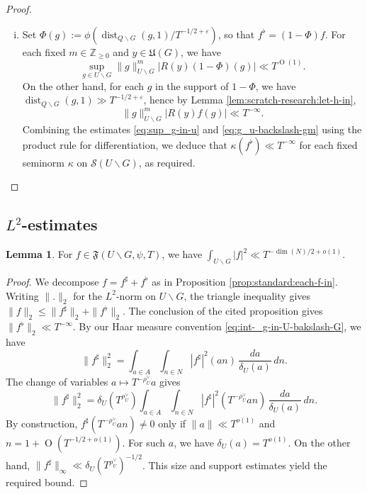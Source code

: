 \documentclass[reqno]{amsart}
\def\eps{\varepsilon}
\DeclareMathOperator{\dist}{dist}
\def\O{\operatorname{O}}
\theoremstyle{plain} \newtheorem{theorem} {Theorem}
\theoremstyle{definition} \newtheorem{definition} [theorem] {Definition}
\theoremstyle{itplain} %
\newtheorem{lemma}[theorem]{Lemma}
\numberwithin{equation}{section}
\numberwithin{theorem}{section}
\renewcommand{\geq}{\geqslant}
\renewcommand{\leq}{\leqslant}
\begin{document}
\begin{proof}
\begin{enumerate}[(i)]
  \item Set $\Phi(g) := \phi \left(\dist_{Q \backslash G}(g,1) / T^{-1/2+\eps} \right)$, so that $f ^\flat = (1 - \Phi) f$.  For each fixed $m \in \mathbb{Z}_{\geq 0}$ and $y \in \mathfrak{U}(G)$, we have
    \begin{equation}\label{eq:sup_g-in-u}
      \sup_{g \in U \backslash G} \|g\|_{U \backslash G}^m \left\lvert  R(y) (1 - \Phi)(g) \right\rvert
      \ll T^{\O(1)}.
    \end{equation}
    On the other hand, for each $g$ in the support of $1 - \Phi$, we have $\dist_{Q \backslash G}(g,1) \gg T^{-1/2+\eps}$, hence by Lemma \ref{lem:scratch-research:let-h-in},
    \begin{equation}\label{eq:g_u-backslash-gm}
      \|g\|_{U \backslash G}^m \left\lvert  R(y) f (g) \right\rvert
      \ll T^{-\infty }.
    \end{equation}
    Combining the estimates \eqref{eq:sup_g-in-u} and \eqref{eq:g_u-backslash-gm} using the product rule for differentiation, we deduce that $\kappa(f ^\flat ) \ll T^{-\infty}$ for each fixed seminorm $\kappa$ on $\mathcal{S}(U \backslash G)$, as required.
  \end{enumerate}

\end{proof}

\subsection{$L^2$-estimates}

\begin{lemma}
  For $f \in \mathfrak{F}(U \backslash G, \psi, T)$, we have $\int _{U \backslash G} |f|^2 \ll T^{-\dim(N)/2 + o(1)}$.
\end{lemma}
\begin{proof}
  We decompose $f = f ^\sharp + f ^\flat$ as in Proposition \ref{prop:standard:each-f-in}.  Writing $\|.\|_2$ for the $L^2$-norm on $U \backslash G$, the triangle inequality gives $\|f\|_2 \leq \|f ^\sharp \|_2 + \|f ^\flat \|_2$.  The conclusion of the cited proposition gives $\|f ^\flat \|_2 \ll T^{-\infty}$.  By our Haar measure convention \eqref{eq:int-_g-in-U-bakslash-G}, we have
  \begin{equation*}
    \|f ^\sharp \|_2^2
    =
    \int _{a \in A}
    \int _{n \in N}
    |f ^\sharp|^2 (a n) \, \frac{d a }{ \delta_U(a)} \, d n.
  \end{equation*}
  The change of variables $a \mapsto T^{-\rho_U^\vee} a$ gives
  \begin{equation*}
    \|f ^\sharp \|_2^2
    =
    \delta_U(T^{\rho_U^\vee})
    \int _{a \in A}
    \int _{n \in N}
    |f ^\sharp|^2 (T^{-\rho_U^\vee} a n) \, \frac{d a }{ \delta_U(a)} \, d n.
  \end{equation*}
  By construction, $f ^\sharp (T ^{- \rho _U ^\vee } a n ) \neq 0$ only if $\|a\| \ll T^{o(1)}$ and $n = 1 + \O(T^{-1/2+o(1)})$.  For such $a$, we have $\delta_U(a) = T^{o(1)}$.  On the other hand, $\|f ^\sharp \|  _\infty \ll \delta_U(T^{\rho_U^\vee})^{-1/2}$.  This size and support estimates yield the required bound.
\end{proof}
\end{document}
